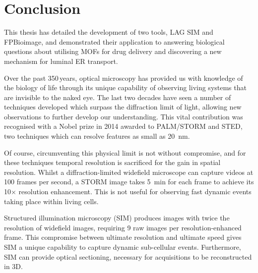 \chapter{Conclusion}
\label{chap:conclusion}


\ifpdf
    \graphicspath{{Chapter6/Figs/Raster/}{Chapter6/Figs/PDF/}{Chapter6/Figs/}}
\else
    \graphicspath{{Chapter6/Figs/Vector/}{Chapter6/Figs/}}
\fi


This thesis has detailed the development of two tools, LAG SIM and FPBioimage, and demonstrated their application to answering biological questions about utilising MOFs for drug delivery and discovering a new mechanism for luminal ER transport. 

Over the past 350\,years, optical microscopy has provided us with knowledge of the biology of life through its unique capability of observing living systems that are invisible to the naked eye. 
The last two decades have seen a number of techniques developed which surpass the diffraction limit of light, allowing new observations to further develop our understanding. 
This vital contribution was recognised with a Nobel prize in 2014 awarded to PALM/STORM and STED, two techniques which can resolve features as small as \SI{20}{\nano\metre}. 

Of course, circumventing this physical limit is not without compromise, and for these techniques temporal resolution is sacrificed for the gain in spatial resolution. 
Whilst a diffraction-limited widefield microscope can capture videos at 100 frames per second, a STORM image takes \SI{5}{\minute} for each frame to achieve its 10$\times$ resolution enhancement. 
This is not useful for observing fast dynamic events taking place within living cells. 

Structured illumination microscopy (SIM) produces images with twice the resolution of widefield images, requiring 9 raw images per resolution-enhanced frame. 
This compromise between ultimate resolution and ultimate speed gives SIM a unique capability to capture dynamic sub-cellular events. 
Furthermore, SIM can provide optical sectioning, necessary for acquisitions to be reconstructed in 3D. 

